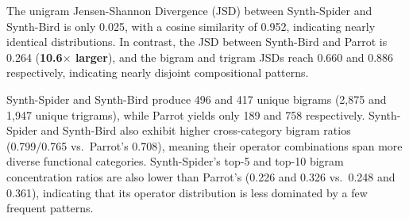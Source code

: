 The unigram Jensen-Shannon Divergence (JSD) between Synth-Spider and Synth-Bird is only 0.025, with a cosine similarity of 0.952, indicating nearly identical distributions. In contrast, the JSD between Synth-Bird and Parrot is 0.264 (\textbf{10.6$\times$ larger}), and the bigram and trigram JSDs reach 0.660 and 0.886 respectively, indicating nearly disjoint compositional patterns.

Synth-Spider and Synth-Bird produce 496 and 417 unique bigrams (2,875 and 1,947 unique trigrams), while Parrot yields only 189 and 758 respectively. Synth-Spider and Synth-Bird also exhibit higher cross-category bigram ratios (0.799/0.765 vs.\ Parrot's 0.708), meaning their operator combinations span more diverse functional categories. Synth-Spider's top-5 and top-10 bigram concentration ratios are also lower than Parrot's (0.226 and 0.326 vs.\ 0.248 and 0.361), indicating that its operator distribution is less dominated by a few frequent patterns.
